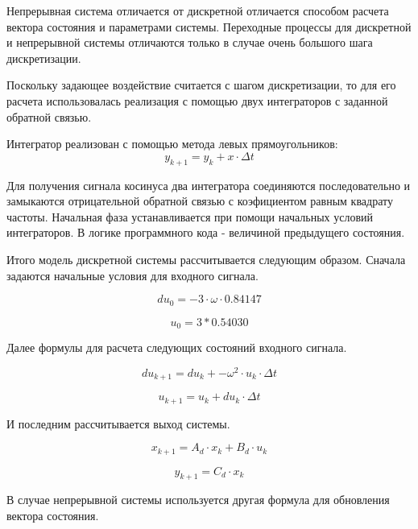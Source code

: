 \documentclass[14pt,a4paper]{extreport}
\begin{document}
Непрерывная система отличается от дискретной отличается способом 
расчета вектора состояния и параметрами системы. Переходные процессы для дискретной и непрерывной системы отличаются 
только в случае очень большого шага дискретизации.

Поскольку задающее воздействие считается с шагом дискретизации,
то для его расчета использовалась реализация с помощью двух интеграторов
с заданной обратной связью.

Интегратор реализован с помощью метода левых прямоугольников:
\begin{equation}
    y_{k+1} = y_{k} + x \cdot \Delta t
\end{equation}

Для получения сигнала косинуса два интегратора 
соединяются последовательно и замыкаются отрицательной обратной связью
с коэфициентом равным квадрату частоты. Начальная фаза устанавливается
при помощи начальных условий интеграторов. В логике программного кода - 
величиной предыдущего состояния.

Итого модель дискретной системы рассчитывается следующим образом.
Сначала задаются начальные условия для входного сигнала.

\begin{equation}
    du_{0} = -3 \cdot \omega \cdot 0.84147
\end{equation}

\begin{equation}
    u_{0} = 3 * 0.54030
\end{equation}

Далее формулы для расчета следующих состояний входного сигнала.

\begin{equation}
    du_{k+1} = du_{k} + -\omega^2 \cdot u_{k} \cdot \Delta t
\end{equation}

\begin{equation}
    u_{k+1} = u_{k} + du_{k} \cdot \Delta t
\end{equation}

И последним рассчитывается выход системы.

\begin{equation}
    x_{k+1} = A_{d} \cdot x_{k} + B_{d} \cdot u_{k}
\end{equation}

\begin{equation}
    y_{k+1} = C_{d} \cdot x_{k}
\end{equation}

В случае непрерывной системы используется другая формула для 
обновления вектора состояния.
\end{document}
